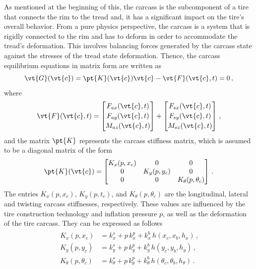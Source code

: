 As mentioned at the beginning of this, the carcass is the subcomponent of a tire that connects the rim to the tread and, it has a significant impact on the tire's overall behavior. From a pure physics perspective, the carcass is a system that is rigidly connected to the rim and has to deform in order to accommodate the tread's deformation. This involves balancing forces generated by the carcass state against the stresses of the tread state deformation. Thence, the carcass equilibrium equations in matrix form are written as
%
\begin{equation}
  \vt{G}(\vt{c}) = \pt{K}(\vt{c}) \vt{c} - \vt{F}(\vt{c},t) = 0 \, \text{,}
  \label{app3:eq:nls}
\end{equation}
%
where
%
\begin{equation}
  \vt{F}(\vt{c},t) =
  \begin{bmatrix}
    F_{ax}(\vt{c},t) \\[0.2em]
    F_{ay}(\vt{c},t) \\[0.2em]
    M_{az}(\vt{c},t)
  \end{bmatrix} + \begin{bmatrix}
    F_{sx}(\vt{c},t) \\[0.2em]
    F_{sy}(\vt{c},t) \\[0.2em]
    M_{sz}(\vt{c},t)
  \end{bmatrix} \, \text{,}
\end{equation}
%
and the matrix $\pt{K}$ represents the carcass stiffness matrix, which is assumed to be a diagonal matrix of the form
%
\begin{equation}
  \pt{K}(\vt{c}) =
  \begin{bmatrix}
    K_x(p,x_c) & 0 & 0 \\
    0 & K_y(p,y_c) & 0 \\
    0 & 0 & K_\theta(p,\theta_c)
  \end{bmatrix} \, \text{.}
\end{equation}
%
The entries $K_x(p,x_c)$, $K_y(p,t_c)$, and $K_\theta(p,\theta_c)$ are the longitudinal, lateral and twisting carcass stiffnesses, respectively. These values are influenced by the tire construction technology and inflation pressure $p$, as well as the deformation of the tire carcass. They can be expressed as follows
%
\begin{equation}
  \begin{split}
    \begin{aligned}
      K_x(p,x_c)           &= k_x^s      + p \, k_x^p      + k_x^b \, h(x_c, x_b, h_x) \, \text{,} \\
      K_y(p,y_c)           &= k_y^s      + p \, k_y^p      + k_y^b \, h(y_c, y_b, h_y) \, \text{,} \\
      K_\theta(p,\theta_c) &= k_\theta^s + p \, k_\theta^p + k_\theta^b \, h(\theta_c, \theta_b, h_\theta) \, \text{.} \\
    \end{aligned}
  \end{split}
\end{equation}
